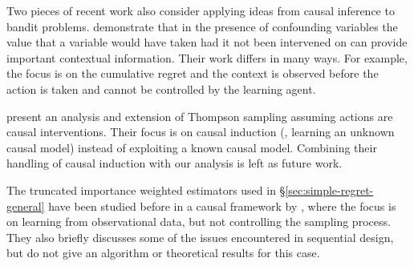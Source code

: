 Two pieces of recent work also consider applying ideas from causal inference to bandit problems.
\citet{Bareinboim2015} demonstrate that in the presence of confounding variables the value that a variable would have taken had it not been 
intervened on can provide important contextual information. Their work differs in many ways. For example, the focus is on the cumulative regret and
the context is observed before the action is taken and cannot be controlled by the learning agent.  


 \citet{Ortega2014thompson} present an analysis and extension of Thompson sampling assuming actions are causal interventions. Their focus is on causal induction (\ie, learning an unknown causal model) instead of exploiting a known causal model. Combining their handling of  causal induction with our analysis is left as future work.

The truncated importance weighted estimators used in \S\ref{sec:simple-regret-general} have been studied before in a causal framework by \citet{BJQ13}, 
where the focus is on learning from observational data, but not controlling the sampling process. They also briefly discusses some of the issues 
encountered in sequential design, but do not give an algorithm or theoretical results for this case.




